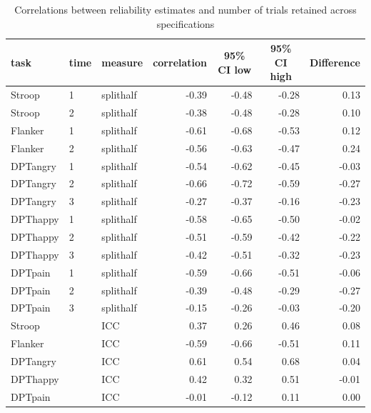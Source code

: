 \documentclass[
  english,
  man,floatsintext]{apa6}
\begin{document}
\begin{table}[tbp]

\begin{center}
\begin{threeparttable}

\caption{\label{tab:tableone}Correlations between reliability estimates and number of trials retained across specifications}

\begin{tabular}{lllrrrr}
\toprule
task & \multicolumn{1}{c}{time} & \multicolumn{1}{c}{measure} & \multicolumn{1}{c}{correlation} & \multicolumn{1}{c}{95\% CI low} & \multicolumn{1}{c}{95\% CI high} & \multicolumn{1}{c}{Difference}\\
\midrule
Stroop & 1 & splithalf & -0.39 & -0.48 & -0.28 & 0.13\\
Stroop & 2 & splithalf & -0.38 & -0.48 & -0.28 & 0.10\\
Flanker & 1 & splithalf & -0.61 & -0.68 & -0.53 & 0.12\\
Flanker & 2 & splithalf & -0.56 & -0.63 & -0.47 & 0.24\\
DPTangry & 1 & splithalf & -0.54 & -0.62 & -0.45 & -0.03\\
DPTangry & 2 & splithalf & -0.66 & -0.72 & -0.59 & -0.27\\
DPTangry & 3 & splithalf & -0.27 & -0.37 & -0.16 & -0.23\\
DPThappy & 1 & splithalf & -0.58 & -0.65 & -0.50 & -0.02\\
DPThappy & 2 & splithalf & -0.51 & -0.59 & -0.42 & -0.22\\
DPThappy & 3 & splithalf & -0.42 & -0.51 & -0.32 & -0.23\\
DPTpain & 1 & splithalf & -0.59 & -0.66 & -0.51 & -0.06\\
DPTpain & 2 & splithalf & -0.39 & -0.48 & -0.29 & -0.27\\
DPTpain & 3 & splithalf & -0.15 & -0.26 & -0.03 & -0.20\\
Stroop &  & ICC & 0.37 & 0.26 & 0.46 & 0.08\\
Flanker &  & ICC & -0.59 & -0.66 & -0.51 & 0.11\\
DPTangry &  & ICC & 0.61 & 0.54 & 0.68 & 0.04\\
DPThappy &  & ICC & 0.42 & 0.32 & 0.51 & -0.01\\
DPTpain &  & ICC & -0.01 & -0.12 & 0.11 & 0.00\\
\bottomrule
\end{tabular}

\end{threeparttable}
\end{center}

\end{table}
\end{document}

